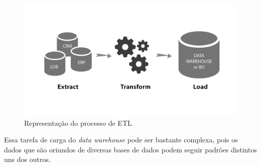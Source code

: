 \begin{figure}[ht]
\centering
\includegraphics[width=1\textwidth]{imagens/etl-processo.png}
\caption{Representação do processo de ETL}
\author{Fonte: https://blog.indicium.tech/etl-vs-elt-diferencas/}
\label{fig:processoETL}
\end{figure}

Essa tarefa de carga do \textit{data warehouse} pode ser bastante complexa, pois os dados que são oriundos de diversas bases de dados podem seguir padrões distintos uns dos outros.